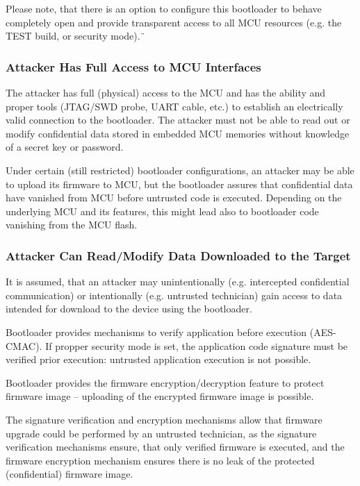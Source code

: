 Please note, that there is an option to configure this bootloader to behave completely open and provide transparent access to all MCU resources (e.g. the TEST build, or  security mode).¨

\subsubsection*{Attacker Has Full Access to MCU Interfaces}

The attacker has full (physical) access to the MCU and has the ability and proper tools (JTAG/SWD probe, UART cable, etc.) 
to establish an electrically valid connection to the bootloader. The attacker must not be able to read out or modify 
confidential data stored in embedded MCU memories without knowledge of a secret key or password.

Under certain (still restricted) bootloader configurations, an attacker may be able to upload its firmware to MCU, 
but the bootloader assures that confidential data have vanished from MCU before untrusted code is executed.
Depending on the underlying MCU and its features, this might lead also to bootloader code vanishing from the MCU flash.

\subsubsection*{Attacker Can Read/Modify Data Downloaded to the Target}

It is assumed, that an attacker may unintentionally (e.g. intercepted confidential communication) or intentionally (e.g. untrusted technician)
gain access to data intended for download to the device using the bootloader.

Bootloader provides mechanisms to verify application before execution (AES-CMAC). 
If propper security mode is set, the application code signature must be verified
prior execution: untrusted application execution is not possible.

Bootloader provides the firmware encryption/decryption feature to protect firmware image -- uploading of the encrypted firmware image is possible.


The signature verification and encryption mechanisms allow that firmware upgrade could be performed by an untrusted technician, 
as the signature verification mechanisms ensure, that only verified firmware is executed, 
and the firmware encryption mechanism ensures there is no leak of the protected (confidential) firmware image.

